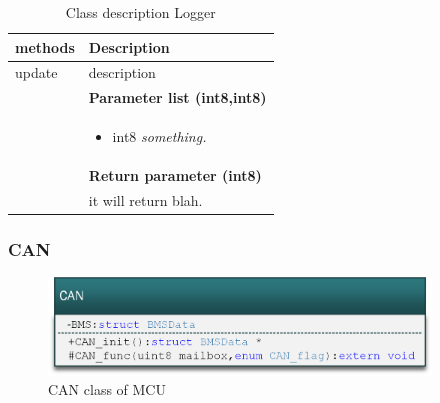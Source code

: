 \begin{table}[H]
	\centering
	\begin{tabular}{|p{5 cm}|p{10 cm}|}
		\hline
		\textbf{methods} & \textbf{Description} \\ \hline
		
		update
		& description
		\\ & \textbf{Parameter list (int8,int8)}
		\\ & \begin{itemize}
			\item {\large int8}
			\subitem \textit{something.}
		\end{itemize}
		\\ & \textbf{Return parameter (int8)}
		\\ & it will return blah.
		\\ \hline
		
	\end{tabular}
	\caption{Class description Logger}
	\label{table:Class_description_Logger_MCU}
\end{table}


\subsubsection{CAN}

\begin{figure}[H]
	\centering
	\includegraphics [width=4in]{Software/Pictures/class-diagram-CAN.png}
	\caption{CAN class of MCU}
	\label{fig:Class_diagram_MCU_CAN}
\end{figure}

